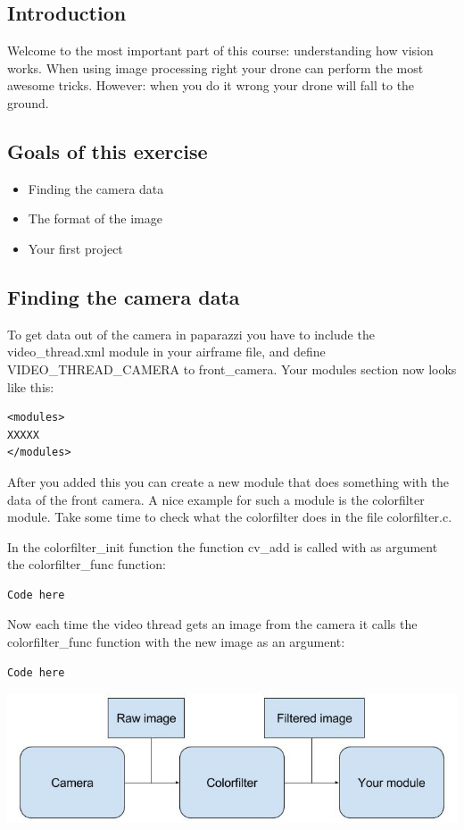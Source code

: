 \documentclass{article}
\begin{document}

\subsection*{Introduction}
Welcome to the most important part of this course: understanding how vision works. When using image processing right your drone can perform the most awesome tricks. However: when you do it wrong your drone will fall to the ground. 

\subsection*{Goals of this exercise}
\begin{itemize}
\item Finding the camera data
\item The format of the image
\item Your first project
\end{itemize}

\subsection*{Finding the camera data}
To get data out of the camera in paparazzi you have to include the video\_thread.xml module in your airframe file, and define VIDEO\_THREAD\_CAMERA to front\_camera. Your modules section now looks like this:
\begin{verbatim}
<modules>
XXXXX
</modules>
\end{verbatim}
After you added this you can create a new module that does something with the data of the front camera. A nice example for such a module is the colorfilter module. Take some time to check what the colorfilter does in the file colorfilter.c. 

In the colorfilter\_init function the function cv\_add is called with as argument the colorfilter\_func function:
\begin{verbatim}
Code here
\end{verbatim}
Now each time the video thread gets an image from the camera it calls the colorfilter\_func function with the new image as an argument:
\begin{verbatim}
Code here
\end{verbatim}
\includegraphics[width=0.8\linewidth]{camerafilter}
\end{document}
